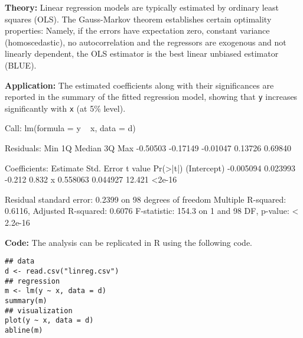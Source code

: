 \begin{solution}
\textbf{Theory:} Linear regression models are typically estimated by ordinary least squares (OLS).
The Gauss-Markov theorem establishes certain optimality properties: Namely, if the errors
have expectation zero, constant variance (homoscedastic), no autocorrelation and the
regressors are exogenous and not linearly dependent, the OLS estimator is the best linear
unbiased estimator (BLUE).

\textbf{Application:} The estimated coefficients along with their significances are reported in the
summary of the fitted regression model, showing that \texttt{y} increases significantly with \texttt{x} (at 5\% level).

\begin{Schunk}
\begin{Soutput}
Call:
lm(formula = y ~ x, data = d)

Residuals:
     Min       1Q   Median       3Q      Max 
-0.50503 -0.17149 -0.01047  0.13726  0.69840 

Coefficients:
             Estimate Std. Error t value Pr(>|t|)
(Intercept) -0.005094   0.023993  -0.212    0.832
x            0.558063   0.044927  12.421   <2e-16

Residual standard error: 0.2399 on 98 degrees of freedom
Multiple R-squared:  0.6116,	Adjusted R-squared:  0.6076 
F-statistic: 154.3 on 1 and 98 DF,  p-value: < 2.2e-16
\end{Soutput}
\end{Schunk}

\textbf{Code:} The analysis can be replicated in R using the following code.

\begin{verbatim}
## data
d <- read.csv("linreg.csv")
## regression
m <- lm(y ~ x, data = d)
summary(m)
## visualization
plot(y ~ x, data = d)
abline(m)
\end{verbatim}
\end{solution}


